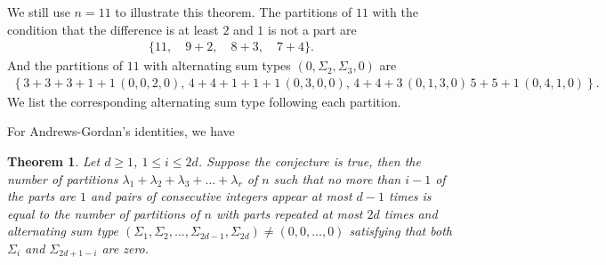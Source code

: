 \documentclass[draft]{amsart}
\numberwithin{equation}{section}
\theoremstyle{plain}
\newtheorem{theorem}{Theorem}[section]
\theoremstyle{remark}
\begin{document}
We still use $n=11$ to illustrate this theorem.  The partitions of $11$ with the condition that the difference is at least
$2$ and $1$ is not a part are
\begin{align*}
\{11,\quad 9+2,\quad 8+3,\quad
7+4 \}.
\end{align*}
And the partitions of $11$ with alternating sum types $(0,\Sigma_{2},\Sigma_{3},0)$ are 
\begin{align*}
\left\{3+3+3+1+1\,(0,0,2,0),\, 4+4+1+1+1\,(0,3,0,0),\, 4+4+3\,(0,1,3,0)\, 5+5+1\,(0,4,1,0)\right\}.
\end{align*}
We list the corresponding alternating sum type following each partition.

For Andrews-Gordan's identities, we have 
\begin{theorem}
Let $d\geq 1$, $1\leq i\leq 2d$.
Suppose the conjecture is true, then the number of partitions $\lambda_{1}+\lambda_{2}+\lambda_{3}+\dots+\lambda_{r}$ of $n$ such that no more than $i-1$ of the parts are $1$ and pairs of consecutive integers appear at most $d-1$
 times is equal to the number of partitions of $n$ with parts repeated  at most $2d$ times and alternating sum type $(\Sigma_{1},\Sigma_{2},\dots,\Sigma_{2d-1},\Sigma_{2d})\neq(0,0,\dots,0)$ satisfying that both $\Sigma_{i}$ and $\Sigma_{2d+1-i}$ are zero.
\end{theorem}
\end{document}
